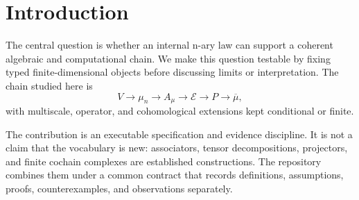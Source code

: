 \section{Introduction}

The central question is whether an internal n-ary law can support a coherent algebraic and computational chain. We make this question testable by fixing typed finite-dimensional objects before discussing limits or interpretation. The chain studied here is
\[
V\longrightarrow \mu_n\longrightarrow A_\mu\longrightarrow \mathcal E\longrightarrow P\longrightarrow \overline\mu,
\]
with multiscale, operator, and cohomological extensions kept conditional or finite.

The contribution is an executable specification and evidence discipline. It is not a claim that the vocabulary is new: associators, tensor decompositions, projectors, and finite cochain complexes are established constructions. The repository combines them under a common contract that records definitions, assumptions, proofs, counterexamples, and observations separately.

